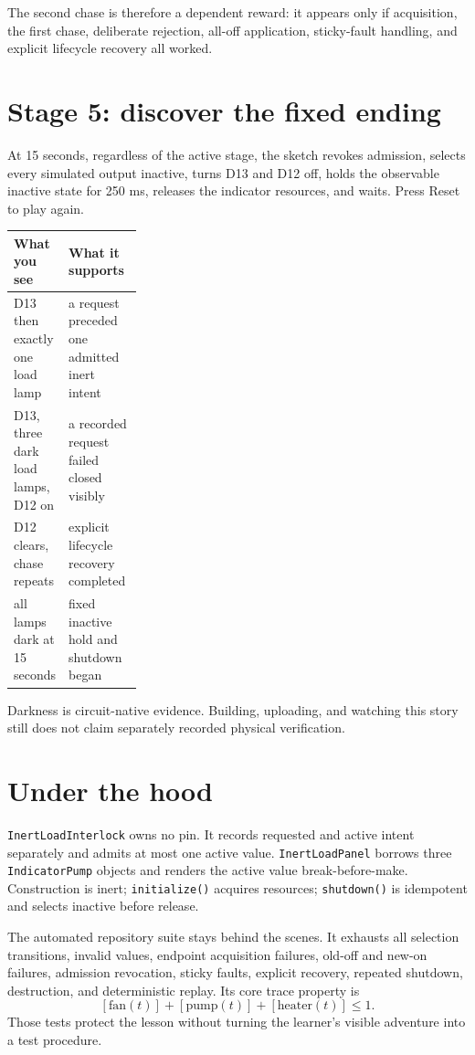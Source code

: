 \documentclass[11pt]{article}
\begin{document}
The second chase is therefore a dependent reward: it appears only if
acquisition, the first chase, deliberate rejection, all-off application,
sticky-fault handling, and explicit lifecycle recovery all worked.

\section*{Stage 5: discover the fixed ending}

At 15 seconds, regardless of the active stage, the sketch revokes admission,
selects every simulated output inactive, turns D13 and D12 off, holds the
observable inactive state for 250 ms, releases the indicator resources, and
waits. Press Reset to play again.

\begin{tabularx}{\linewidth}{@{}p{0.28\linewidth}X@{}}
\toprule
What you see & What it supports\\\midrule
D13 then exactly one load lamp & a request preceded one admitted inert intent\\
D13, three dark load lamps, D12 on & a recorded request failed closed visibly\\
D12 clears, chase repeats & explicit lifecycle recovery completed\\
all lamps dark at 15 seconds & fixed inactive hold and shutdown began\\
\bottomrule
\end{tabularx}

Darkness is circuit-native evidence. Building, uploading, and watching this
story still does not claim separately recorded physical verification.

\section*{Under the hood}

\texttt{InertLoadInterlock} owns no pin. It records requested and active
intent separately and admits at most one active value.
\texttt{InertLoadPanel} borrows three \texttt{IndicatorPump} objects and
renders the active value break-before-make. Construction is inert;
\texttt{initialize()} acquires resources; \texttt{shutdown()} is idempotent
and selects inactive before release.

The automated repository suite stays behind the scenes. It exhausts all
selection transitions, invalid values, endpoint acquisition failures,
old-off and new-on failures, admission revocation, sticky faults, explicit
recovery, repeated shutdown, destruction, and deterministic replay. Its core
trace property is
\[
[\mathrm{fan}(t)]+[\mathrm{pump}(t)]+[\mathrm{heater}(t)]\leq1.
\]
Those tests protect the lesson without turning the learner's visible adventure
into a test procedure.
\end{document}
